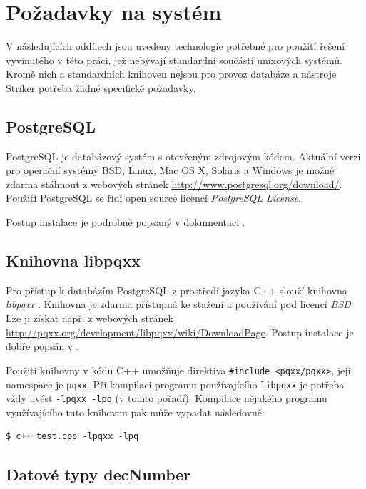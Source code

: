 \documentclass[thesis=M,czech]{FITthesis}[2012/06/26]
\begin{document}
\section{Požadavky na systém}

V následujících oddílech jsou uvedeny technologie potřebné pro použití řešení vyvinutého v této práci, jež nebývají 
standardní součástí unixových systémů. Kromě nich a standardních knihoven nejsou pro provoz databáze a nástroje 
Striker potřeba žádné specifické požadavky.


\subsection{PostgreSQL}

PostgreSQL je databázový systém s otevřeným zdrojovým kódem. Aktuální verzi pro operační systémy BSD, Linux, Mac OS X, 
Solaris a Windows je možné zdarma stáhnout z webových stránek \url{http://www.postgresql.org/download/}. Použití PostgreSQL 
se řídí open source licencí \textit{PostgreSQL License}.

Postup instalace je podrobně popsaný v dokumentaci \cite{pgdoc}.


\subsection{Knihovna libpqxx}

Pro přístup k databázím PostgreSQL z prostředí jazyka C++ slouží knihovna \textit{libpqxx} \cite{libpqxx}. Knihovna je zdarma 
přístupná ke stažení a používání pod licencí \textit{BSD}. Lze ji získat např. z webových stránek 
\url{http://pqxx.org/development/libpqxx/wiki/DownloadPage}. Postup instalace je dobře popsán v \cite{libpqxxtut}.

Použití knihovny v kódu C++ umožňuje direktiva \texttt{\#include <pqxx/pqxx>}, její namespace je \texttt{pqxx}. Při kompilaci 
programu používajícího \texttt{libpqxx} je potřeba vždy uvést \texttt{-lpqxx -lpq} (v tomto pořadí). Kompilace nějakého 
programu využívajícího tuto knihovnu pak může vypadat následovně:

\begin{lstlisting}[basicstyle={\small\ttfamily}] 
   $ c++ test.cpp -lpqxx -lpq
\end{lstlisting}



\subsection{Datové typy decNumber}
\end{document}
